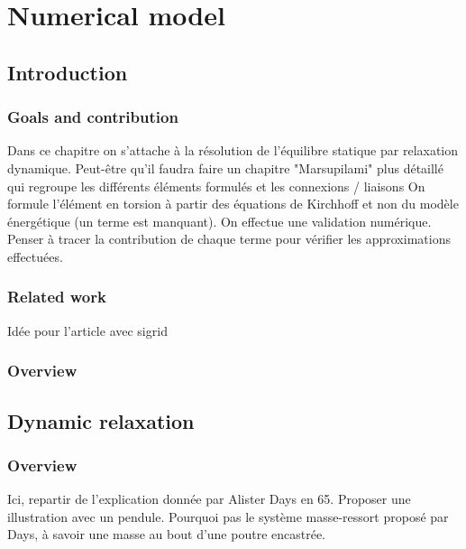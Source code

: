 \chapter{Numerical model}

\section{Introduction}

\subsection{Goals and contribution}
Dans ce chapitre on s'attache à la résolution de l'équilibre statique par relaxation dynamique.
Peut-être qu'il faudra faire un chapitre "Marsupilami" plus détaillé qui regroupe les différents éléments formulés et les connexions / liaisons
On formule l'élément en torsion à partir des équations de Kirchhoff et non du modèle énergétique (un terme est manquant).
On effectue une validation numérique. Penser à tracer la contribution de chaque terme pour vérifier les approximations effectuées.

\subsection{Related work}
\cite{Day1965}
\cite{Otter1965}
\cite{Papadrakakis1981}
\cite{Miki2014}
\cite{Alamatian2012}
\cite{Rezaiee-pajand2011a}

Idée pour l'article avec sigrid \cite{Alamatian2012}

\subsection{Overview}

\section{Dynamic relaxation}

\subsection{Overview}
Ici, repartir de l'explication donnée par Alister Days en 65.
Proposer une illustration avec un pendule. Pourquoi pas le système masse-ressort proposé par Days, à savoir une masse au bout d'une poutre encastrée.

